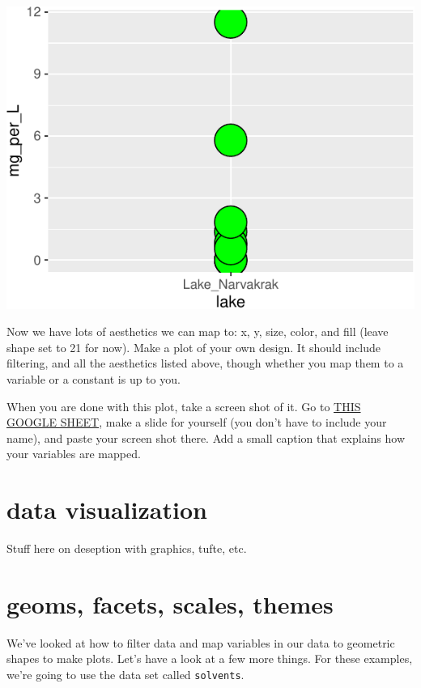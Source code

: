 \documentclass[
]{krantz}
\begin{document}
\begin{center}\includegraphics[width=0.8\linewidth]{index_files/figure-latex/unnamed-chunk-53-1} \end{center}

Now we have lots of aesthetics we can map to: x, y, size, color, and fill (leave shape set to 21 for now). Make a plot of your own design. It should include filtering, and all the aesthetics listed above, though whether you map them to a variable or a constant is up to you.

When you are done with this plot, take a screen shot of it. Go to \href{https://docs.google.com/presentation/d/1G0BJ_qye9a_HAPLktFytj66qSj20BjoUOTKtjmCyuN0/edit?usp=sharing}{THIS GOOGLE SHEET}, make a slide for yourself (you don't have to include your name), and paste your screen shot there. Add a small caption that explains how your variables are mapped.

\hypertarget{data-visualization}{%
\section*{data visualization}\label{data-visualization}}

Stuff here on deseption with graphics, tufte, etc.

\hypertarget{geoms_facets_scales_themes}{%
\section{geoms, facets, scales, themes}\label{geoms_facets_scales_themes}}

We've looked at how to filter data and map variables in our data to geometric shapes to make plots. Let's have a look at a few more things. For these examples, we're going to use the data set called \texttt{solvents}.
\end{document}
